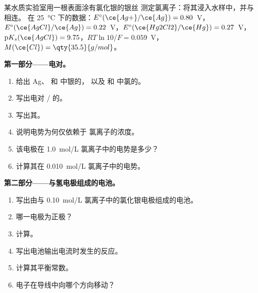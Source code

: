 \begin{problem}
\label{pb:b1:nernst:1}
某水质实验室用一根表面涂有氯化银的银丝
测定氯离子：将其浸入水样中，并与相连。
在 \qty{25}{\celsius} 下的数据：$E^\circ(\ce{Ag+}/\ce{Ag}) = 0.80$~V，
$E^\circ(\ce{AgCl}/\ce{Ag}) = 0.22$~V，$E^\circ(\ce{Hg2Cl2}/\ce{Hg}) =
0.27$~V，$\mathrm{p}K_s(\ce{AgCl}) = 9.75$，$RT\ln 10/F = 0.059$~V，
$M(\ce{Cl}) = \qty{35.5}{g/mol}$。

\medskip
\noindent\textbf{第一部分——电对。}
\begin{enumerate}
  \item 给出 Ag、 和  中银的，
        以及  和  中氯的。
  \item 写出电对 / 的。
  \item 写出其。
  \item 说明电势为何仅依赖于
        氯离子的浓度。
  \item 该电极在 \qty{1.0}{mol/L}
        氯离子中的电势是多少？
  \item 计算其在 \qty{0.010}{mol/L} 氯离子中的电势。
\end{enumerate}

\medskip
\noindent\textbf{第二部分——与氢电极组成的电池。}
\begin{enumerate}[resume]
  \item 写出由与
        \qty{0.10}{mol/L} 氯离子中的氯化银电极组成的电池。
  \item 哪一电极为正极？
  \item 计算。
  \item 写出电池输出电流时发生的反应。
  \item 计算其平衡常数。
  \item 电子在导线中向哪个方向移动？
\end{enumerate}


\end{problem}
